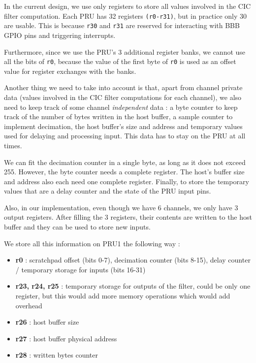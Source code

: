 \documentclass[]{report}
\providecommand{\tightlist}{%
	\setlength{\itemsep}{0pt}\setlength{\parskip}{0pt}}
\begin{document}
In the current design, we use only registers to store all values involved in the CIC filter computation. Each PRU has 32 registers \texttt{(r0-r31)}, but in practice only 30 are usable. This is because \texttt{r30} and \texttt{r31} are reserved for interacting with BBB GPIO pins and triggering interrupts.

Furthermore, since we use the PRU's 3 additional register banks, we cannot use all the bits of \texttt{r0}, because the value of the first byte of \texttt{r0} is used as an offset value for register exchanges with the banks.

Another thing we need to take into account is that, apart from channel private data (values involved in the CIC filter computations for each channel), we also need to keep track of some channel \textit{independent} data : a byte counter to keep track of the number of bytes written in the host buffer, a sample counter to implement decimation, the host buffer's size and address and temporary values used for delaying and processing input. This data has to stay on the PRU at all times.

We can fit the decimation counter in a single byte, as long as it does not exceed 255. However, the byte counter needs a complete register. The host's buffer size and address also each need one complete register. Finally, to store the temporary values that are a delay counter and the state of the PRU input pins.

Also, in our implementation, even though we have 6 channels, we only have 3 output registers. After filling the 3 registers, their contents are written to the host buffer and they can be used to store new inputs.

We store all this information on PRU1 the following way :

\begin{itemize}
\tightlist
\item
  \textbf{r0} : scratchpad offset (bits 0-7), decimation counter (bits
  8-15), delay counter / temporary storage for inputs (bits 16-31)
\item
  \textbf{r23, r24, r25} : temporary storage for outputs of the filter,
  could be only one register, but this would add more memory operations
  which would add overhead
\item
  \textbf{r26} : host buffer size
\item
  \textbf{r27} : host buffer physical address
\item
  \textbf{r28} : written bytes counter
\end{itemize}
\end{document}
